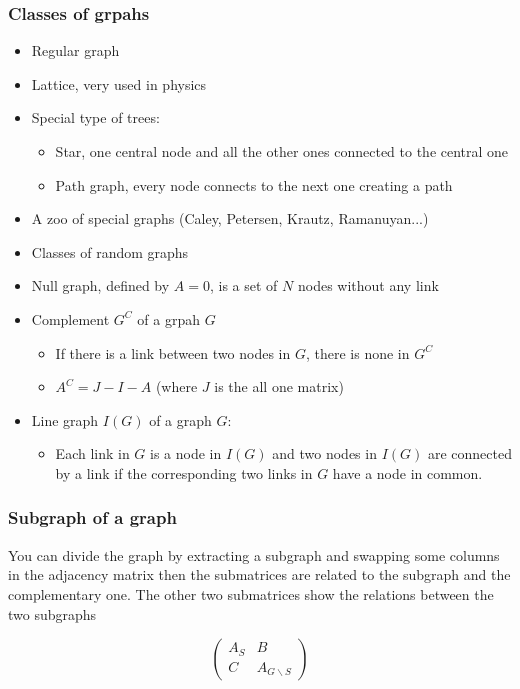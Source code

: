 \subsubsection{Classes of grpahs}
\begin{itemize}
  \item Regular graph
  \item Lattice, very used in physics
  \item Special type of trees:
  \begin{itemize}
    \item Star, one central node and all the other ones connected to the central one
    \item Path graph, every node connects to the next one creating a path
  \end{itemize}
  \item A zoo of special graphs (Caley, Petersen, Krautz, Ramanuyan...)
  \item Classes of random graphs
  \item Null graph, defined by $A = 0$, is a set of $N$ nodes without any link
  \item Complement $G^C$ of a grpah $G$
  \begin{itemize}
    \item If there is a link between two nodes in $G$, there is none in $G^C$
    \item $A^C = J - I - A$ (where $J$ is the all one matrix)
  \end{itemize}
  \item Line graph $I(G)$ of a graph $G$:
  \begin{itemize}
    \item Each link in $G$ is a node in $I(G)$ and two nodes in $I(G)$ are connected by a link
    if the corresponding two links in $G$ have a node in common.
  \end{itemize}
\end{itemize}

\subsubsection{Subgraph of a graph \label{sec:subgraph}}

You can divide the graph by extracting a subgraph and swapping some columns in the adjacency matrix
then the submatrices are related to the subgraph and the complementary one. The other two 
submatrices show the relations between the two subgraphs

$$
\begin{pmatrix}
  A_S & B \\
  C & A_{G \backslash S}
\end{pmatrix}
$$

